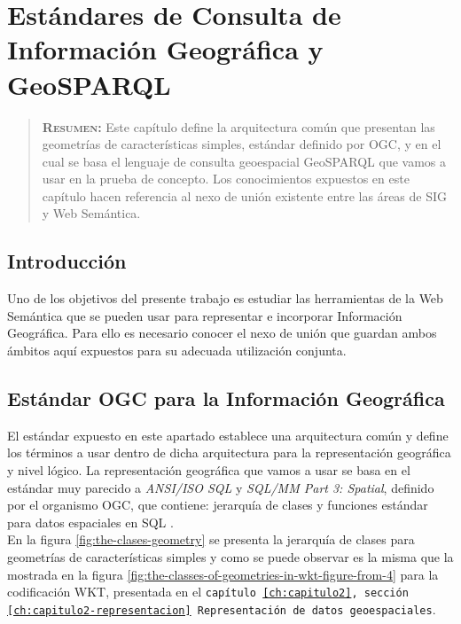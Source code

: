 
\chapter{Estándares de Consulta de Información Geográfica y GeoSPARQL}
\label{ch:capitulo4}

\begin{quote}
  {\bf\textsc{Resumen:}} Este capítulo define la arquitectura común que presentan las geometrías de características simples, estándar definido por OGC, y en el cual se basa el lenguaje de consulta geoespacial GeoSPARQL que vamos a usar en la prueba de concepto. Los conocimientos expuestos en este capítulo hacen referencia al nexo de unión existente entre las áreas de SIG y Web Semántica.
\end{quote}

\section{Introducción}

Uno de los objetivos del presente trabajo es estudiar las herramientas de la Web Semántica que se pueden usar para representar e incorporar Información Geográfica. Para ello es necesario conocer el nexo de unión que guardan ambos ámbitos aquí expuestos para su adecuada utilización conjunta.


\section{Estándar OGC para la Información Geográfica}
\label{ch:capitulo4-estandar}

El estándar expuesto en este apartado establece una arquitectura común y define los términos a usar dentro de dicha arquitectura para la representación geográfica y nivel lógico. La representación geográfica que vamos a usar se basa en el estándar muy parecido a \textit{ANSI/ISO SQL} y \textit{SQL/MM Part 3: Spatial}, definido por el organismo OGC, que contiene: jerarquía de clases y funciones estándar para datos espaciales en SQL \cite{AsignaturaSIG}.\\

En la figura \ref{fig:the-clases-geometry} se presenta la jerarquía de clases para geometrías de características simples y como se puede observar es la misma que la mostrada en la figura \ref{fig:the-classes-of-geometries-in-wkt-figure-from-4} para la codificación WKT, presentada en el \texttt{capítulo \ref{ch:capitulo2}, sección \ref{ch:capitulo2-representacion} Representación de datos geoespaciales}.

